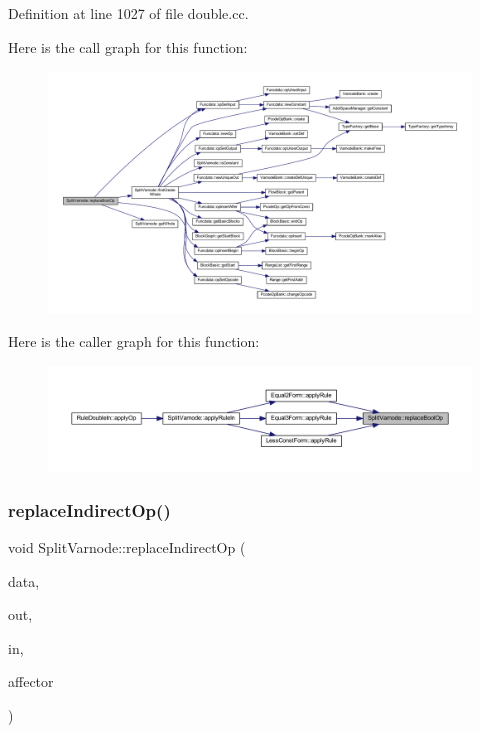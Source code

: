 Definition at line 1027 of file double.\+cc.

Here is the call graph for this function\+:
\nopagebreak
\begin{figure}[H]
\begin{center}
\leavevmode
\includegraphics[width=350pt]{class_split_varnode_afcb8b8c5221764a535eb066b15149f84_cgraph}
\end{center}
\end{figure}
Here is the caller graph for this function\+:
\nopagebreak
\begin{figure}[H]
\begin{center}
\leavevmode
\includegraphics[width=350pt]{class_split_varnode_afcb8b8c5221764a535eb066b15149f84_icgraph}
\end{center}
\end{figure}
\mbox{\label{class_split_varnode_abe58b89c66472db3c107fd338348e918}} 
\subsubsection{\texorpdfstring{replaceIndirectOp()}{replaceIndirectOp()}}
{\footnotesize\ttfamily void Split\+Varnode\+::replace\+Indirect\+Op (\begin{DoxyParamCaption}\item[{\mbox{\hyperlink{class_funcdata}{Funcdata}} \&}]{data,  }\item[{\mbox{\hyperlink{class_split_varnode}{Split\+Varnode}} \&}]{out,  }\item[{\mbox{\hyperlink{class_split_varnode}{Split\+Varnode}} \&}]{in,  }\item[{\mbox{\hyperlink{class_pcode_op}{Pcode\+Op}} $\ast$}]{affector }\end{DoxyParamCaption})\hspace{0.3cm}{\ttfamily [static]}}



